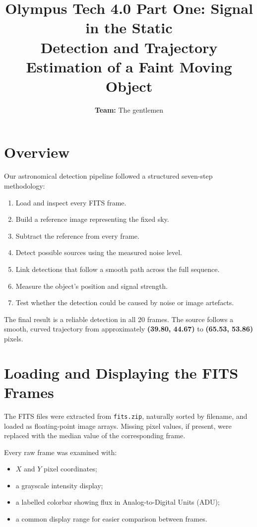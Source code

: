 \documentclass[11pt,a4paper]{article}
\title{\textbf{Olympus Tech 4.0  Part One: Signal in the Static}\\[0.5em]
\large Detection and Trajectory Estimation of a Faint Moving Object}
\author{\textbf{Team:} The gentlemen}
\date{}
\begin{document}
\maketitle

\section{Overview}

Our astronomical detection pipeline followed a structured seven-step methodology:
\begin{enumerate}[noitemsep]
    \item Load and inspect every FITS frame.
    \item Build a reference image representing the fixed sky.
    \item Subtract the reference from every frame.
    \item Detect possible sources using the measured noise level.
    \item Link detections that follow a smooth path across the full sequence.
    \item Measure the object's position and signal strength.
    \item Test whether the detection could be caused by noise or image artefacts.
\end{enumerate}

The final result is a reliable detection in all 20 frames. The source follows a smooth, curved trajectory from approximately \textbf{(39.80, 44.67)} to \textbf{(65.53, 53.86)} pixels.

\section{Loading and Displaying the FITS Frames}

The FITS files were extracted from \texttt{fits.zip}, naturally sorted by filename, and loaded as floating-point image arrays. Missing pixel values, if present, were replaced with the median value of the corresponding frame.

Every raw frame was examined with:
\begin{itemize}[noitemsep]
    \item $X$ and $Y$ pixel coordinates;
    \item a grayscale intensity display;
    \item a labelled colorbar showing flux in Analog-to-Digital Units (ADU);
    \item a common display range for easier comparison between frames.
\end{itemize}
\end{document}
